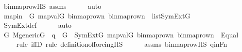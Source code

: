 \begin{isabellebody}
\ binmap{\isacharunderscore}{\kern0pt}row{\isacharprime}{\kern0pt}{\isacharunderscore}{\kern0pt}HS\ assms\isanewline
\ \ \ \ \isamarkupfalse%
\ auto\isanewline
\ \ \isamarkupfalse%
\ \isamarkupfalse%
\ mapin\ {\isacharcolon}{\kern0pt}\ {\isachardoublequoteopen}{\isasymAnd}G{\isachardot}{\kern0pt}\ map{\isacharparenleft}{\kern0pt}val{\isacharparenleft}{\kern0pt}G{\isacharparenright}{\kern0pt}{\isacharcomma}{\kern0pt}\ {\isacharbrackleft}{\kern0pt}binmap{\isacharunderscore}{\kern0pt}row{\isacharprime}{\kern0pt}{\isacharparenleft}{\kern0pt}n{\isacharparenright}{\kern0pt}{\isacharcomma}{\kern0pt}\ binmap{\isacharunderscore}{\kern0pt}row{\isacharprime}{\kern0pt}{\isacharparenleft}{\kern0pt}n{\isacharprime}{\kern0pt}{\isacharparenright}{\kern0pt}{\isacharbrackright}{\kern0pt}{\isacharparenright}{\kern0pt}\ {\isasymin}\ list{\isacharparenleft}{\kern0pt}SymExt{\isacharparenleft}{\kern0pt}G{\isacharparenright}{\kern0pt}{\isacharparenright}{\kern0pt}{\isachardoublequoteclose}\ \isanewline
\ \ \ \ \isamarkupfalse%
\ SymExt{\isacharunderscore}{\kern0pt}def\isanewline
\ \ \ \ \isamarkupfalse%
\ auto\isanewline
\isanewline
\ \ \isamarkupfalse%
\ {\isachardoublequoteopen}{\isasymforall}G{\isachardot}{\kern0pt}\ M{\isacharunderscore}{\kern0pt}generic{\isacharparenleft}{\kern0pt}G{\isacharparenright}{\kern0pt}\ {\isasymand}\ q\ {\isasymin}\ G\ {\isasymlongrightarrow}\ SymExt{\isacharparenleft}{\kern0pt}G{\isacharparenright}{\kern0pt}{\isacharcomma}{\kern0pt}\ map{\isacharparenleft}{\kern0pt}val{\isacharparenleft}{\kern0pt}G{\isacharparenright}{\kern0pt}{\isacharcomma}{\kern0pt}\ {\isacharbrackleft}{\kern0pt}binmap{\isacharunderscore}{\kern0pt}row{\isacharprime}{\kern0pt}{\isacharparenleft}{\kern0pt}n{\isacharparenright}{\kern0pt}{\isacharcomma}{\kern0pt}\ binmap{\isacharunderscore}{\kern0pt}row{\isacharprime}{\kern0pt}{\isacharparenleft}{\kern0pt}n{\isacharprime}{\kern0pt}{\isacharparenright}{\kern0pt}{\isacharbrackright}{\kern0pt}{\isacharparenright}{\kern0pt}\ {\isasymTurnstile}\ Equal{\isacharparenleft}{\kern0pt}{}{\isacharcomma}{\kern0pt}\ {}{\isacharparenright}{\kern0pt}{\isachardoublequoteclose}\isanewline
\ \ \ \ \isamarkupfalse%
{\isacharparenleft}{\kern0pt}rule\ iffD{}{\isacharcomma}{\kern0pt}\ rule\ definition{\isacharunderscore}{\kern0pt}of{\isacharunderscore}{\kern0pt}forcing{\isacharunderscore}{\kern0pt}HS{\isacharparenright}{\kern0pt}\isanewline
\ \ \ \ \isamarkupfalse%
\ assms\ binmap{\isacharunderscore}{\kern0pt}row{\isacharprime}{\kern0pt}{\isacharunderscore}{\kern0pt}HS\ qinFn\isanewline

\end{isabellebody}
